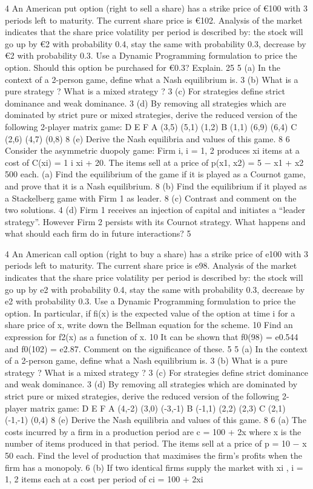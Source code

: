 4 An American put option (right to sell a share) has a strike price of €100
with 3 periods left to maturity. The current share price is €102. Analysis
of the market indicates that the share price volatility per period is described
by: the stock will go up by €2 with probability 0.4, stay the same with
probability 0.3, decrease by €2 with probability 0.3.
Use a Dynamic Programming formulation to price the option. Should this
option be purchased for €0.3? Explain. 25
5 (a) In the context of a 2-person game, define what a Nash equilibrium is. 3
(b) What is a pure strategy ? What is a mixed strategy ? 3
(c) For strategies define strict dominance and weak dominance. 3
(d) By removing all strategies which are dominated by strict pure or mixed
strategies, derive the reduced version of the following 2-player matrix
game:
D E F
A (3,5) (5,1) (1,2)
B (1,1) (6,9) (6,4)
C (2,6) (4,7) (0,8)
8
(e) Derive the Nash equilibria and values of this game. 8
6 Consider the asymmetric duopoly game: Firm i, i = 1, 2 produces xi
items
at a cost of
C(xi) = 1
i
xi + 20.
The items sell at a price of
p(x1, x2) = 5 −
x1 + x2
500
each.
(a) Find the equilibrium of the game if it is played as a Cournot game,
and prove that it is a Nash equilibrium. 8
(b) Find the equilibrium if it played as a Stackelberg game with Firm 1 as
leader. 8
(c) Contrast and comment on the two solutions. 4
(d) Firm 1 receives an injection of capital and initiates a “leader strategy”.
However Firm 2 persists with its Cournot strategy. What happens and
what should each firm do in future interactions? 5



4 An American call option (right to buy a share) has a strike price of e100
with 3 periods left to maturity. The current share price is e98. Analysis
of the market indicates that the share price volatility per period is described
by: the stock will go up by e2 with probability 0.4, stay the same with
probability 0.3, decrease by e2 with probability 0.3.
Use a Dynamic Programming formulation to price the option. In particular,
if fi(x) is the expected value of the option at time i for a share price of x,
write down the Bellman equation for the scheme. 10
Find an expression for f2(x) as a function of x. 10
It can be shown that f0(98) = e0.544 and f0(102) = e2.87. Comment on
the significance of these. 5
5 (a) In the context of a 2-person game, define what a Nash equilibrium is. 3
(b) What is a pure strategy ? What is a mixed strategy ? 3
(c) For strategies define strict dominance and weak dominance. 3
(d) By removing all strategies which are dominated by strict pure or mixed
strategies, derive the reduced version of the following 2-player matrix
game:
D E F
A (4,-2) (3,0) (-3,-1)
B (-1,1) (2,2) (2,3)
C (2,1) (-1,-1) (0,4)
8
(e) Derive the Nash equilibria and values of this game. 8
6 (a) The costs incurred by a firm in a production period are
c = 100 + 2x
where x is the number of items produced in that period. The items sell
at a price of
p = 10 −
x
50
each. Find the level of production that maximises the firm’s profits
when the firm has a monopoly. 6
(b) If two identical firms supply the market with xi
, i = 1, 2 items each
at a cost per period of
ci = 100 + 2xi

